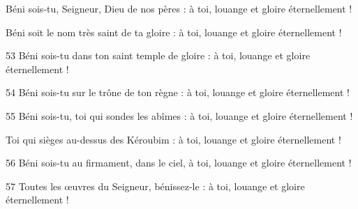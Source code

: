Béni sois-tu, Seigneur, Dieu de nos pères :
à toi, louange et gloire éternellement !

Béni soit le nom très saint de ta gloire :
à toi, louange et gloire éternellement !

53 Béni sois-tu dans ton saint temple de gloire :
à toi, louange et gloire éternellement !

54 Béni sois-tu sur le trône de ton règne :
à toi, louange et gloire éternellement !

55 Béni sois-tu, toi qui sondes les abîmes :
à toi, louange et gloire éternellement !

Toi qui sièges au-dessus des Kéroubim :
à toi, louange et gloire éternellement !

56 Béni sois-tu au firmament, dans le ciel,
à toi, louange et gloire éternellement !

57 Toutes les œuvres du Seigneur, bénissez-le :
à toi, louange et gloire éternellement !